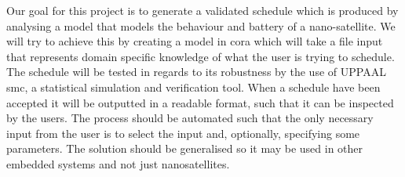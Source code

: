 Our goal for this project is to generate a validated schedule which is produced by analysing a model that models the behaviour and battery of a nano-satellite. 
We will try to achieve this by creating a model in \gls{cora} which will take a file input that represents domain specific knowledge of what the user is trying to schedule.
The schedule will be tested in regards to its robustness by the use of UPPAAL \gls{smc}, a statistical simulation and verification tool. 
When a schedule have been accepted it will be outputted in a readable format, such that it can be inspected by the users. 
The process should be automated such that the only necessary input from the user is to select the input and, optionally, specifying some parameters. 
The solution should be generalised so it may be used in other embedded systems and not just nanosatellites.
\glsresetall




